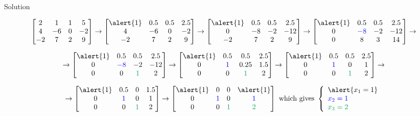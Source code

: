 \documentclass[xcolor=dvipsnames,aspectratio=169,t]{beamer}
\begin{document}
\begin{frame}{Solution}

  {\small 
\[ \begin{bmatrix}
  2 & 1 & 1 & 5\\
  4 & -6 & 0 & -2\\
  -2 & 7 & 2 & 9
\end{bmatrix}
\rightarrow
 \begin{bmatrix}
  \alert{1} & 0.5 & 0.5 & 2.5\\
  4 & -6 & 0 & -2\\
  -2 & 7 & 2 & 9
 \end{bmatrix}
 \rightarrow 
 \begin{bmatrix}
  \alert{1} & 0.5 & 0.5 & 2.5\\
  0 & -8 & -2 & -12\\
  -2 & 7 & 2 & 9
 \end{bmatrix}
 \rightarrow 
 \begin{bmatrix}
  \alert{1} & 0.5 & 0.5 & 2.5\\
  0 & \colorb{-8} & -2 & -12\\
  0 & 8 & 3 & 14
 \end{bmatrix}
 \rightarrow 
 \] }

{\small
  \[ \rightarrow
 \begin{bmatrix}
  \alert{1} & 0.5 & 0.5 & 2.5\\
  0 & \colorb{-8} & -2 & -12\\
  0 & 0 & \colorg{1} & 2
 \end{bmatrix}
\rightarrow
\begin{bmatrix}
  \alert{1} & 0.5 & 0.5 & 2.5\\
  0 & \colorb{1} & 0.25 & 1.5\\
  0 & 0 & \colorg{1} & 2
\end{bmatrix}
\rightarrow
\begin{bmatrix}
  \alert{1} & 0.5 & 0.5 & 2.5\\
  0 & \colorb{1} & 0 & 1\\
  0 & 0 & \colorg{1} & 2
\end{bmatrix}
\rightarrow
\]
}

{\small
  \[ \rightarrow
  \begin{bmatrix}
  \alert{1} & 0.5 & 0 & 1.5\\
  0 & \colorb{1} & 0 & 1\\
  0 & 0 & \colorg{1} & 2
\end{bmatrix}
\rightarrow
\begin{bmatrix}
  \alert{1} & 0 & 0 & \alert{1}\\
  0 & \colorb{1} & 0 & \colorb{1}\\
  0 & 0 & \colorg{1} & \colorg{2}
\end{bmatrix}
\mbox{ which gives }
\left\{ \begin{array}{l}
  \alert{x_1 = 1}\\
  \colorb{x_2 = 1} \\ 
  \colorg{x_3 = 2} \end{array} \right. \]
}

\end{frame}
\end{document}
